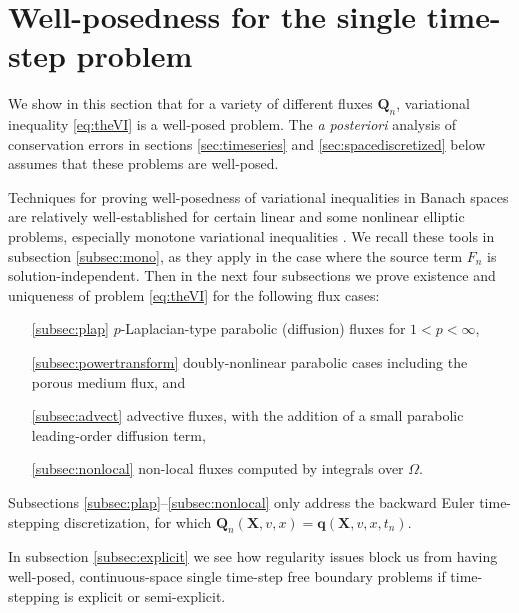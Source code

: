 \documentclass[final,leqno,onefignum,onetabnum]{siamltex1213bueler}
\newcommand\bq{\mathbf{q}}
\newcommand\bQ{\mathbf{Q}}
\newcommand\bX{\mathbf{X}}
\begin{document}
\section{Well-posedness for the single time-step problem} \label{sec:wellposed}

We show in this section that for a variety of different fluxes $\bQ_n$, variational inequality \eqref{eq:theVI} is a well-posed problem.  The \emph{a posteriori} analysis of conservation errors in sections \ref{sec:timeseries} and \ref{sec:spacediscretized} below assumes that these problems are well-posed.

Techniques for proving well-posedness of variational inequalities in Banach spaces are relatively well-established for certain linear and some nonlinear elliptic problems, especially monotone variational inequalities \cite{KinderlehrerStampacchia1980}.  We recall these tools in subsection \ref{subsec:mono}, as they apply in the case where the source term $F_n$ is solution-independent.  Then in the next four subsections we prove existence and uniqueness of problem \eqref{eq:theVI} for the following flux cases:
\begin{itemize}
\item[\ref{subsec:plap}] $p$-Laplacian-type parabolic (diffusion) fluxes for $1<p<\infty$,
\item[\ref{subsec:powertransform}] doubly-nonlinear parabolic cases including the porous medium flux, and
\item[\ref{subsec:advect}] advective fluxes, with the addition of a small parabolic leading-order diffusion term,
\item[\ref{subsec:nonlocal}] non-local fluxes computed by integrals over $\Omega$.
\end{itemize}
Subsections \ref{subsec:plap}--\ref{subsec:nonlocal} only address the backward Euler time-stepping discretization, for which $\bQ_n(\bX,v,x) = \bq(\bX,v,x,t_n)$.

In subsection \ref{subsec:explicit} we see how regularity issues block us from having well-posed, continuous-space single time-step free boundary problems if time-stepping is explicit or semi-explicit.
\end{document}
